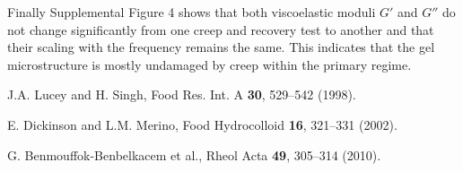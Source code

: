 \documentclass[twocolumn,superscriptaddress,showpacs,preprintnumbers,amsmath,amssymb,prl]{revtex4}
\begin{document}
Finally Supplemental Figure 4 shows that both viscoelastic moduli $G'$ and $G''$ do not change significantly from one creep and recovery test to another and that their scaling with the frequency remains the same. This indicates that the gel microstructure is mostly undamaged by creep within the primary regime.

\begin{thebibliography}{}

 J.A. Lucey and H. Singh, Food Res. Int. A {\bf 30}, 529--542 (1998).

 E. Dickinson and L.M. Merino, Food Hydrocolloid {\bf 16}, 321--331 (2002).

 G. Benmouffok-Benbelkacem et al., Rheol Acta {\bf 49}, 305--314 (2010).

\end{thebibliography}
\end{document}
